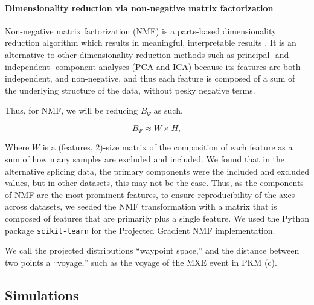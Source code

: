 \paragraph{Dimensionality reduction via non-negative matrix factorization}
Non-negative matrix factorization (NMF) is a parts-based dimensionality reduction algorithm which results in meaningful, interpretable results \cite{Lee:1999gw}. It is an alternative to other dimensionality reduction methods such as principal- and independent- component analyses (PCA and ICA) because its features are both independent, and non-negative, and thus each feature is composed of a sum of the underlying structure of the data, without pesky negative terms.

Thus, for NMF, we will be reducing $B_\Psi$ as such,

\begin{equation}
B_\Psi \approx W \times H,
\end{equation}

Where $W$ is a (features, $2$)-size matrix of the composition of each feature as a sum of how many samples are excluded and included. We found that in the alternative splicing data, the primary components were the included and excluded values, but in other datasets, this may not be the case. Thus, as the components of NMF are the most prominent features, to ensure reproducibility of the axes across datasets, we seeded the NMF transformation with a matrix that is composed of features that are primarily \0 plus a single \1 feature. We used the Python package \texttt{scikit-learn} \cite{Pedregosa:2011tv} for the Projected Gradient NMF implementation.

We call the projected distributions ``waypoint space,'' and the distance between two points a ``voyage,'' such as the voyage of the MXE event in PKM (c).


\subsection{Simulations}
\label{subsubsec:bonvoyage_simulations}

